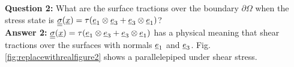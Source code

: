\documentclass[letter,12pt]{article}
\begin{document}
\noindent \textbf{Question 2:} What are the surface tractions over the boundary $\partial \Omega$ when the stress state is $\underline{\underline{\sigma}} (\underline{x}) = \tau (\underline{e}_1 \otimes \underline{e}_3 + \underline{e}_3 \otimes \underline{e}_1 )$? \\

\noindent \textbf{Answer 2:}  $\underline{\underline{\sigma}} (\underline{x}) = \tau (\underline{e}_1 \otimes \underline{e}_3 + \underline{e}_3 \otimes \underline{e}_1 )$ has a physical meaning that shear tractions over the surfaces with normals $\underline{e}_1$ and $\underline{e}_3$. Fig. \ref{fig:replacewithrealfigure2} shows a parallelepiped under shear stress. \\
\end{document}
